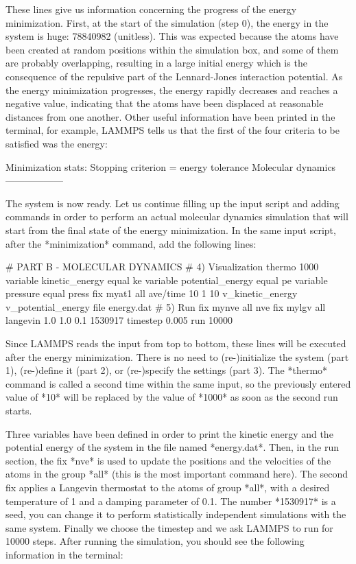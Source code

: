 These lines give us information concerning
the progress of the energy minimization. First, at the start
of the simulation (step 0), the energy in the system is
huge: 78840982 (unitless). This was expected because
the atoms have been created at random positions within the
simulation box, and some of them are probably overlapping,
resulting in a large initial energy which is the consequence
of the repulsive part of the Lennard-Jones interaction
potential. As the energy minimization progresses, the energy
rapidly decreases and reaches a negative value, indicating that the atoms have been
displaced at reasonable distances from one another. Other
useful information have been printed in the terminal, for
example, LAMMPS tells us that the first of the four criteria
to be satisfied was the energy:

\begin{lcverbatim}
Minimization stats:
Stopping criterion = energy tolerance
Molecular dynamics
------------------
\end{lcverbatim}


The system is now ready. Let us continue filling up the
input script and adding commands in order to perform an actual molecular dynamics
simulation that will start from the final state of the energy minimization.
In the same input script, after the *minimization* command, add the following
lines:

\begin{lcverbatim}
# PART B - MOLECULAR DYNAMICS
# 4) Visualization
thermo 1000
variable kinetic_energy equal ke
variable potential_energy equal pe
variable pressure equal press
fix myat1 all ave/time 10 1 10 v_kinetic_energy v_potential_energy file energy.dat
# 5) Run
fix mynve all nve
fix mylgv all langevin 1.0 1.0 0.1 1530917
timestep 0.005
run 10000
\end{lcverbatim}

Since LAMMPS reads the input from top to
bottom, these lines will be executed after the energy
minimization. There is no need to (re-)initialize the system
(part 1), (re-)define it (part 2), or (re-)specify the settings
(part 3). The *thermo* command is called a second time within the 
same input, so the previously entered value of *10* will be replaced
by the value of *1000* as soon as the second run starts.

Three variables have been defined in order
to print the kinetic energy and the potential energy 
of the system in the file named *energy.dat*. Then,
in the run section, the fix *nve* is used to update the
positions and the velocities of the atoms in the group
*all* (this is the most important command here). The second
fix applies a Langevin thermostat to the atoms of group
*all*, with a desired temperature of 1 and a damping
parameter of 0.1. The number *1530917* is a seed, you can
change it to perform statistically independent simulations
with the same system. Finally we choose the timestep
and we ask LAMMPS to run for 10000 steps. After running
the simulation, you should see the following information in
the terminal:

